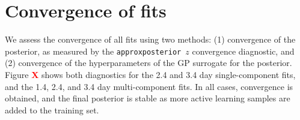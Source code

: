 \documentclass[twocolumn,twocolappendix]{aastex63}
\def\approxposterior{\texttt{approxposterior}}
\newcommand\redbf[1]{\textbf{\textcolor{red}{#1}}}
\begin{document}
\section{Convergence of fits}\label{app:convergence}

We assess the convergence of all fits using two methods: (1) convergence of the posterior, as measured by the \approxposterior~$z$ convergence diagnostic, and (2) convergence of the hyperparameters of the GP surrogate for the posterior. Figure \redbf{X} shows both diagnostics for the 2.4 and 3.4 day single-component fits, and the 1.4, 2.4, and 3.4 day multi-component fits. In all cases, convergence is obtained, and the final posterior is stable as more active learning samples are added to the training set.




\end{document}

